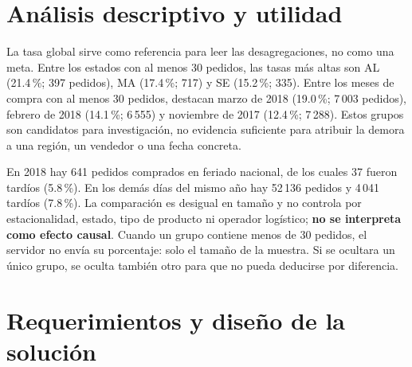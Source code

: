 \documentclass[12pt,a4paper]{article}
\begin{document}
\section{Análisis descriptivo y utilidad}
La tasa global sirve como referencia para leer las desagregaciones, no como una meta. Entre los estados con al menos 30 pedidos, las tasas más altas son AL (21.4\,\%; 397 pedidos), MA (17.4\,\%; 717) y SE (15.2\,\%; 335). Entre los meses de compra con al menos 30 pedidos, destacan marzo de 2018 (19.0\,\%; 7\,003 pedidos), febrero de 2018 (14.1\,\%; 6\,555) y noviembre de 2017 (12.4\,\%; 7\,288). Estos grupos son candidatos para investigación, no evidencia suficiente para atribuir la demora a una región, un vendedor o una fecha concreta.

En 2018 hay 641 pedidos comprados en feriado nacional, de los cuales 37 fueron tardíos (5.8\,\%). En los demás días del mismo año hay 52\,136 pedidos y 4\,041 tardíos (7.8\,\%). La comparación es desigual en tamaño y no controla por estacionalidad, estado, tipo de producto ni operador logístico; \textbf{no se interpreta como efecto causal}. Cuando un grupo contiene menos de 30 pedidos, el servidor no envía su porcentaje: solo el tamaño de la muestra. Si se ocultara un único grupo, se oculta también otro para que no pueda deducirse por diferencia.



\section{Requerimientos y diseño de la solución}
\end{document}
